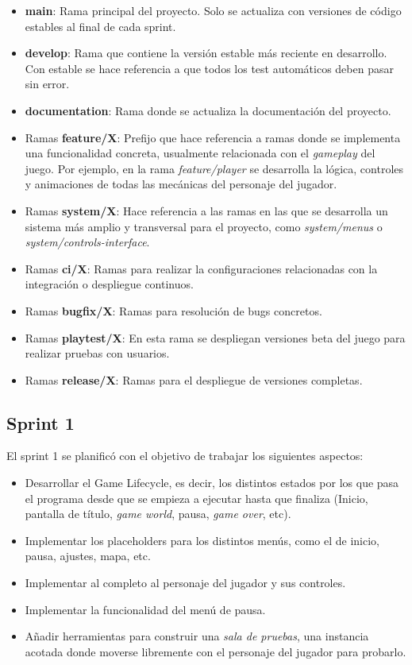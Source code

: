 \begin{itemize}
    \item \textbf{main}: Rama principal del proyecto. Solo se actualiza con versiones de código estables al final de cada sprint.
    \item \textbf{develop}: Rama que contiene la versión estable más reciente en desarrollo. Con estable se hace referencia a que todos los test automáticos deben pasar sin error.
    \item \textbf{documentation}: Rama donde se actualiza la documentación del proyecto.
    \item Ramas \textbf{feature/X}: Prefijo que hace referencia a ramas donde se implementa una funcionalidad concreta, usualmente relacionada con el \textit{gameplay} del juego. Por ejemplo, en la rama \textit{feature/player} se desarrolla la lógica, controles y animaciones de todas las mecánicas del personaje del jugador.
    \item Ramas \textbf{system/X}: Hace referencia a las ramas en las que se desarrolla un sistema más amplio y transversal para el proyecto, como \textit{system/menus} o \textit{system/controls-interface}.
    \item Ramas \textbf{ci/X}: Ramas para realizar la configuraciones relacionadas con la integración o despliegue continuos.
    \item Ramas \textbf{bugfix/X}: Ramas para resolución de bugs concretos.
    \item Ramas \textbf{playtest/X}: En esta rama se despliegan versiones beta del juego para realizar pruebas con usuarios.
    \item Ramas \textbf{release/X}: Ramas para el despliegue de versiones completas.
\end{itemize}

\subsection{Sprint 1}

El sprint 1 se planificó con el objetivo de trabajar los siguientes aspectos:

\begin{itemize}
    \item Desarrollar el Game Lifecycle, es decir, los distintos estados por los que pasa el programa desde que se empieza a ejecutar hasta que finaliza (Inicio, pantalla de título, \textit{game world}, pausa, \textit{game over}, etc).
    \item Implementar los placeholders para los distintos menús, como el de inicio, pausa, ajustes, mapa, etc.
    \item Implementar al completo al personaje del jugador y sus controles.
    \item Implementar la funcionalidad del menú de pausa.
    \item Añadir herramientas para construir una \textit{sala de pruebas}, una instancia acotada donde moverse libremente con el personaje del jugador para probarlo.
\end{itemize}

